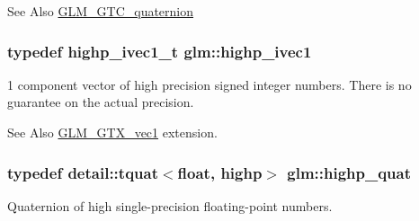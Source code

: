 \begin{DoxySeeAlso}{See Also}
\hyperlink{group__gtc__quaternion}{G\-L\-M\-\_\-\-G\-T\-C\-\_\-quaternion} 
\end{DoxySeeAlso}
\hypertarget{namespaceglm_addb6724b01f125e2730aeaad6130b06f}{
\subsubsection[{highp\-\_\-ivec1}]{\setlength{\rightskip}{0pt plus 5cm}typedef {\bf highp\-\_\-ivec1\-\_\-t} {\bf glm\-::highp\-\_\-ivec1}}}\label{namespaceglm_addb6724b01f125e2730aeaad6130b06f}
1 component vector of high precision signed integer numbers. There is no guarantee on the actual precision. \begin{DoxySeeAlso}{See Also}
\hyperlink{group__gtx__vec1}{G\-L\-M\-\_\-\-G\-T\-X\-\_\-vec1} extension. 
\end{DoxySeeAlso}
\hypertarget{namespaceglm_a8d2836172e6561f6519c39d0b5d025c1}{
\subsubsection[{highp\-\_\-quat}]{\setlength{\rightskip}{0pt plus 5cm}typedef {\bf detail\-::tquat}$<$float, highp$>$ {\bf glm\-::highp\-\_\-quat}}}\label{namespaceglm_a8d2836172e6561f6519c39d0b5d025c1}
Quaternion of high single-\/precision floating-\/point numbers.

